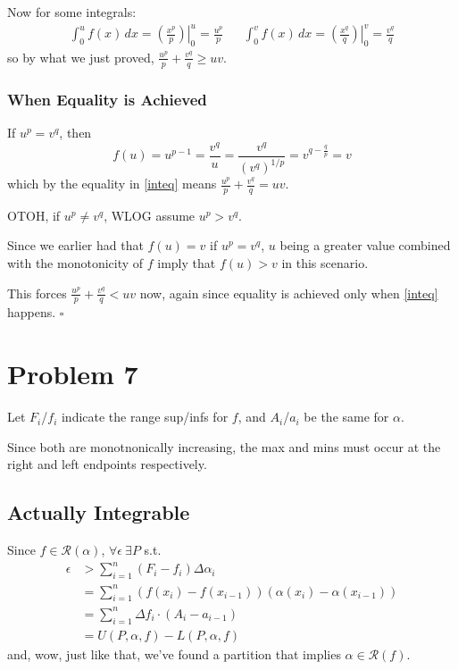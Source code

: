 \documentclass[12pt]{article}
\begin{document}
Now for some integrals:
\begin{align*}
  \int_{0}^{u} f(x)\,dx = \left.\left(\frac{x^p}{p}\right)\right|^u_0=\frac{u^p}{p} &  &
  \int_{0}^{v} f(x)\,dx = \left.\left(\frac{x^q}{q}\right)\right|^v_0=\frac{v^q}{q}
\end{align*}
so by what we just proved, $\frac{u^p}{p}+\frac{v^q}{q} \ge uv$.

\subsubsection{When Equality is Achieved}

If $u^p=v^q$, then
\[f(u)=u^{p-1}=\frac{v^q}{u}=\frac{v^q}{\left(v^q\right)^{1/p}}=v^{q-\frac{q}{p}}=v\]
which by the equality in \eqref{inteq} means $\frac{u^p}{p}+\frac{v^q}{q} = uv$.

OTOH, if $u^p \ne v^q$, WLOG assume $u^p > v^q$.

Since we earlier had that $f(u)=v$ if $u^p=v^q$, $u$ being a greater value
combined with the monotonicity of $f$ imply that $f(u) > v$ in this scenario.

This forces $\frac{u^p}{p}+\frac{v^q}{q} < uv$ now, again since
equality is achieved only when \eqref{inteq} happens. $\square$

\pagebreak

\section{Problem 7}

Let $F_i$/$f_i$ indicate the range sup/infs for $f$,
and $A_i$/$a_i$ be the same for $\alpha$.

Since both are monotnonically increasing, the max and mins must occur
at the right and left endpoints respectively.

\subsection{Actually Integrable}

Since $f \in \mathcal{R}(\alpha)$, $\forall \epsilon\ \exists P$ s.t.
\begin{align*}
  \epsilon & > \sum_{i=1}^{n} (F_i-f_i)\Delta \alpha_i                         \\
           & = \sum_{i=1}^{n} (f(x_i)-f(x_{i-1}))(\alpha(x_i)-\alpha(x_{i-1})) \\
           & = \sum_{i=1}^{n} \Delta f_i \cdot (A_i-a_{i-1})                   \\
           & = U(P, \alpha, f) - L(P, \alpha, f)
\end{align*}
and, wow, just like that, we've found a partition that implies $\alpha \in \mathcal{R}(f)$.
\end{document}

